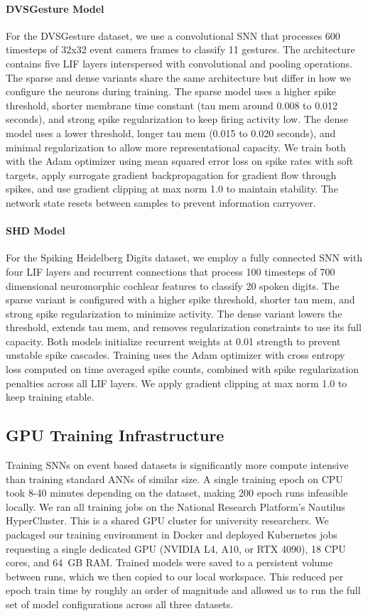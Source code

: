 \documentclass[conference]{IEEEtran}
\begin{document}
\paragraph*{DVSGesture Model}
For the DVSGesture dataset, we use a convolutional SNN that processes 600 timesteps of 32x32 event camera frames to classify 11 gestures. The architecture contains five LIF layers interspersed with convolutional and pooling operations. The sparse and dense variants share the same architecture but differ in how we configure the neurons during training. The sparse model uses a higher spike threshold, shorter membrane time constant (tau mem around 0.008 to 0.012 seconds), and strong spike regularization to keep firing activity low. The dense model uses a lower threshold, longer tau mem (0.015 to 0.020 seconds), and minimal regularization to allow more representational capacity. We train both with the Adam optimizer using mean squared error loss on spike rates with soft targets, apply surrogate gradient backpropagation for gradient flow through spikes, and use gradient clipping at max norm 1.0 to maintain stability. The network state resets between samples to prevent information carryover.
\paragraph*{SHD Model}
For the Spiking Heidelberg Digits dataset, we employ a fully connected SNN with four LIF layers and recurrent connections that process 100 timesteps of 700 dimensional neuromorphic cochlear features to classify 20 spoken digits. The sparse variant is configured with a higher spike threshold, shorter tau mem, and strong spike regularization to minimize activity. The dense variant lowers the threshold, extends tau mem, and removes regularization constraints to use its full capacity. Both models initialize recurrent weights at 0.01 strength to prevent unstable spike cascades. Training uses the Adam optimizer with cross entropy loss computed on time averaged spike counts, combined with spike regularization penalties across all LIF layers. We apply gradient clipping at max norm 1.0 to keep training stable.


\subsection{GPU Training Infrastructure}

Training SNNs on event based datasets is significantly more compute intensive than training standard ANNs of similar size. A single training epoch on CPU took 8-40 minutes depending on the dataset, making 200 epoch runs infeasible locally. We ran all training jobs on the National Research Platform's Nautilus HyperCluster. This is a shared GPU cluster for university researchers. We packaged our training environment in Docker and deployed Kubernetes jobs requesting a single dedicated GPU (NVIDIA L4, A10, or RTX 4090), 18 CPU cores, and 64~GB RAM. Trained models were saved to a persistent volume between runs, which we then copied to our local workspace. This reduced per epoch train time by roughly an order of magnitude and allowed us to run the full set of model configurations across all three datasets.
\end{document}
